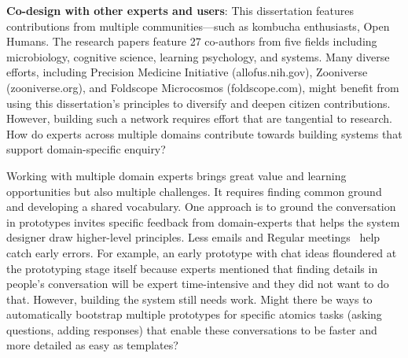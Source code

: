 
\textbf{Co-design with other experts and users}: This dissertation features contributions from multiple communities—such as kombucha enthusiasts, Open Humans. The research papers feature 27 co-authors from five fields including microbiology, cognitive science, learning psychology, and systems. Many diverse efforts, including Precision Medicine Initiative (allofus.nih.gov), Zooniverse (zooniverse.org), and Foldscope Microcosmos (foldscope.com), might benefit from using this dissertation’s principles to diversify and deepen citizen contributions. However, building such a network requires effort that are tangential to research. How do experts across multiple domains contribute towards building systems that support domain-specific enquiry? 

Working with multiple domain experts brings great value and learning opportunities but also multiple challenges. It requires finding common ground and developing a shared vocabulary. One approach is to ground the conversation in prototypes invites specific feedback from domain-experts that helps the system designer draw higher-level principles. Less emails and Regular meetings~\cite{rocco1998trust} help catch early errors. For example, an early prototype with chat ideas floundered at the prototyping stage itself because experts mentioned that finding details in people's conversation will be expert time-intensive and they did not want to do that. However, building the system still needs work. Might there be ways to automatically bootstrap multiple prototypes for specific atomics tasks (asking questions, adding responses) that enable these conversations to be faster and more detailed as easy as templates? 




